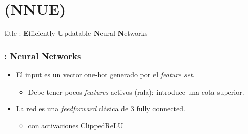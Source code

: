 
\section{ (NNUE)}

\begin{frame}
\vfill
\centering
\begin{beamercolorbox}[sep=8pt,center,shadow=false,rounded=false]{title}
    : \textbf{E}fficiently \textbf{U}pdatable \textbf{N}eural \textbf{N}etworks
    \par%
\end{beamercolorbox}
\vfill
\end{frame}



\begin{frame}
\frametitle{: \textbf{N}eural \textbf{N}etworks}
\begin{itemize}
\item El input es un vector one-hot generado por el \textit{feature set}.
\begin{itemize}
    \item Debe tener pocos \textit{features} activos (rala): introduce una cota superior.
\end{itemize}
\item La red es una \textit{feedforward} clásica de 3 fully connected.
\begin{itemize}
    \item con activaciones ClippedReLU
\end{itemize}
\end{itemize}
\end{frame}

